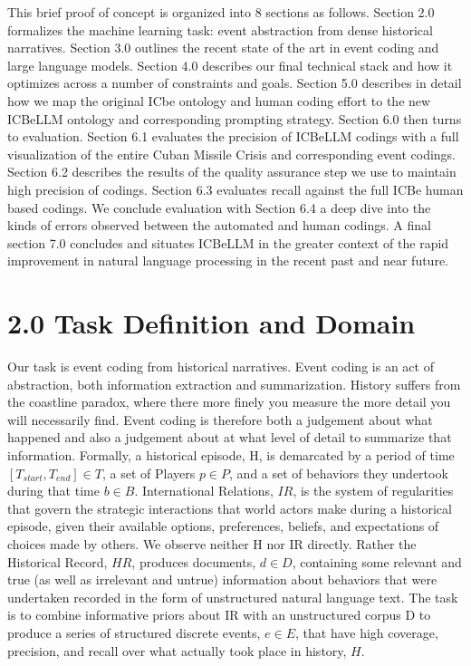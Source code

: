 \documentclass[
  letterpaper,
  DIV=11,
  numbers=noendperiod]{scrartcl}
\begin{document}
This brief proof of concept is organized into 8 sections as follows.
Section 2.0 formalizes the machine learning task: event abstraction from
dense historical narratives. Section 3.0 outlines the recent state of
the art in event coding and large language models. Section 4.0 describes
our final technical stack and how it optimizes across a number of
constraints and goals. Section 5.0 describes in detail how we map the
original ICbe ontology and human coding effort to the new ICBeLLM
ontology and corresponding prompting strategy. Section 6.0 then turns to
evaluation. Section 6.1 evaluates the precision of ICBeLLM codings with
a full visualization of the entire Cuban Missile Crisis and
corresponding event codings. Section 6.2 describes the results of the
quality assurance step we use to maintain high precision of codings.
Section 6.3 evaluates recall against the full ICBe human based codings.
We conclude evaluation with Section 6.4 a deep dive into the kinds of
errors observed between the automated and human codings. A final section
7.0 concludes and situates ICBeLLM in the greater context of the rapid
improvement in natural language processing in the recent past and near
future.

\hypertarget{task-definition-and-domain}{%
\section{2.0 Task Definition and
Domain}\label{task-definition-and-domain}}

Our task is event coding from historical narratives. Event coding is an
act of abstraction, both information extraction and summarization.
History suffers from the coastline paradox, where there more finely you
measure the more detail you will necessarily find. Event coding is
therefore both a judgement about what happened and also a judgement
about at what level of detail to summarize that information. Formally, a
historical episode, H, is demarcated by a period of time
\([T_{start}, T_{end}] ∈ T\), a set of Players \(p ∈ P\), and a set of
behaviors they undertook during that time \(b ∈ B\). International
Relations, \(IR\), is the system of regularities that govern the
strategic interactions that world actors make during a historical
episode, given their available options, preferences, beliefs, and
expectations of choices made by others. We observe neither H nor IR
directly. Rather the Historical Record, \(HR\), produces documents,
\(d ∈ D\), containing some relevant and true (as well as irrelevant and
untrue) information about behaviors that were undertaken recorded in the
form of unstructured natural language text. The task is to combine
informative priors about IR with an unstructured corpus D to produce a
series of structured discrete events, \(e ∈ E\), that have high
coverage, precision, and recall over what actually took place in
history, \(H\).
\end{document}
